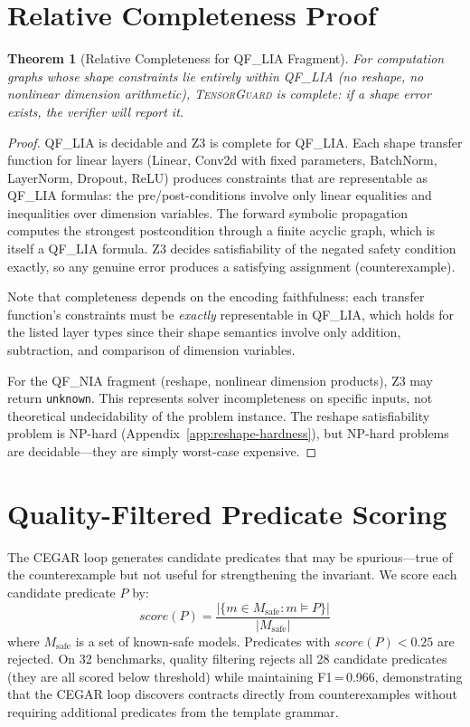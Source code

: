 \documentclass[11pt]{article}
\newtheorem{theorem}{Theorem}
\begin{document}
\section{Relative Completeness Proof}\label{app:completeness-proof}

\begin{theorem}[Relative Completeness for QF\_LIA Fragment]
For computation graphs whose shape constraints lie entirely within
QF\_LIA (no reshape, no nonlinear dimension arithmetic),
\textsc{TensorGuard} is complete: if a shape error exists, the
verifier will report it.
\end{theorem}

\begin{proof}
QF\_LIA is decidable and Z3 is complete for QF\_LIA.  Each shape
transfer function for linear layers (Linear, Conv2d with fixed
parameters, BatchNorm, LayerNorm, Dropout, ReLU) produces constraints
that are representable as QF\_LIA formulas: the pre/post-conditions
involve only linear equalities and inequalities over dimension variables.
The forward symbolic propagation computes the
strongest postcondition through a finite acyclic graph, which is
itself a QF\_LIA formula.  Z3 decides satisfiability of the negated
safety condition exactly, so any genuine error produces a
satisfying assignment (counterexample).

Note that completeness depends on the encoding faithfulness:
each transfer function's constraints must be \emph{exactly}
representable in QF\_LIA, which holds for the listed layer types
since their shape semantics involve only addition, subtraction,
and comparison of dimension variables.

For the QF\_NIA fragment (reshape, nonlinear dimension products),
Z3 may return \texttt{unknown}.  This represents solver
incompleteness on specific inputs, not theoretical undecidability
of the problem instance.  The reshape satisfiability problem is
NP-hard (Appendix~\ref{app:reshape-hardness}), but NP-hard problems
are decidable---they are simply worst-case expensive.
\end{proof}


\section{Quality-Filtered Predicate Scoring}\label{app:quality-scoring}

The CEGAR loop generates candidate predicates that may be
spurious---true of the counterexample but not useful for
strengthening the invariant.  We score each candidate predicate
$P$ by:
\[
  \mathit{score}(P) =
    \frac{|\{m \in M_{\text{safe}} : m \models P\}|}{|M_{\text{safe}}|}
\]
where $M_{\text{safe}}$ is a set of known-safe models.  Predicates
with $\mathit{score}(P) < 0.25$ are rejected.  On 32 benchmarks,
quality filtering rejects all 28 candidate predicates (they are
all scored below threshold) while maintaining F1\,=\,0.966,
demonstrating that the CEGAR loop discovers contracts directly
from counterexamples without requiring additional predicates
from the template grammar.
\end{document}
